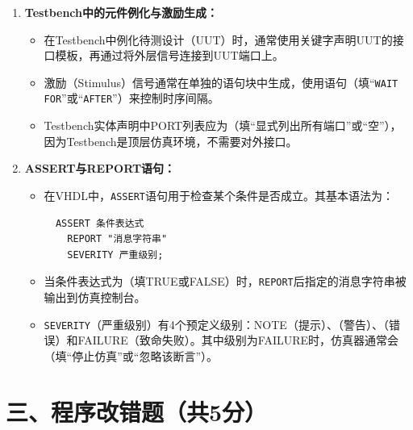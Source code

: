 \begin{enumerate}[label=\arabic*.]
\item \textbf{Testbench中的元件例化与激励生成：}
\begin{itemize}
  \item 在Testbench中例化待测设计（UUT）时，通常使用\underline{\hspace{2cm}}关键字声明UUT的接口模板，再通过\underline{\hspace{2cm}}将外层信号连接到UUT端口上。
  \item 激励（Stimulus）信号通常在单独的\underline{\hspace{2cm}}语句块中生成，使用\underline{\hspace{2cm}}语句（填“\texttt{WAIT FOR}”或“\texttt{AFTER}”）来控制时序间隔。
  \item Testbench实体声明中PORT列表应为\underline{\hspace{2.5cm}}（填“显式列出所有端口”或“空”），因为Testbench是顶层仿真环境，不需要对外接口。
\end{itemize}

\vspace{0.5cm}

\item \textbf{ASSERT与REPORT语句：}
\begin{itemize}
  \item 在VHDL中，\texttt{ASSERT}语句用于检查某个条件是否成立。其基本语法为：
  \begin{verbatim}
  ASSERT 条件表达式
    REPORT "消息字符串"
    SEVERITY 严重级别;
  \end{verbatim}
  \item 当条件表达式为\underline{\hspace{2.5cm}}（填TRUE或FALSE）时，\texttt{REPORT}后指定的消息字符串被输出到仿真控制台。
  \item \texttt{SEVERITY}（严重级别）有4个预定义级别：NOTE（提示）、\underline{\hspace{1.5cm}}（警告）、\underline{\hspace{1.5cm}}（错误）和FAILURE（致命失败）。其中级别为FAILURE时，仿真器通常会\underline{\hspace{3cm}}（填“停止仿真”或“忽略该断言”）。
\end{itemize}

\end{enumerate}

\newpage

\section*{三、程序改错题（共5分）}

